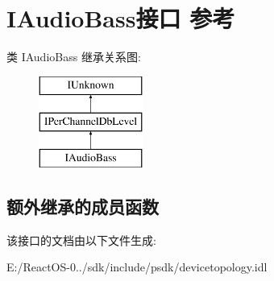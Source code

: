 \hypertarget{interface_i_audio_bass}{}\section{I\+Audio\+Bass接口 参考}
\label{interface_i_audio_bass}
类 I\+Audio\+Bass 继承关系图\+:\begin{figure}[H]
\begin{center}
\leavevmode
\includegraphics[height=3.000000cm]{interface_i_audio_bass}
\end{center}
\end{figure}
\subsection*{额外继承的成员函数}


该接口的文档由以下文件生成\+:\begin{DoxyCompactItemize}
\item 
E\+:/\+React\+O\+S-\/0../sdk/include/psdk/devicetopology.\+idl\end{DoxyCompactItemize}
